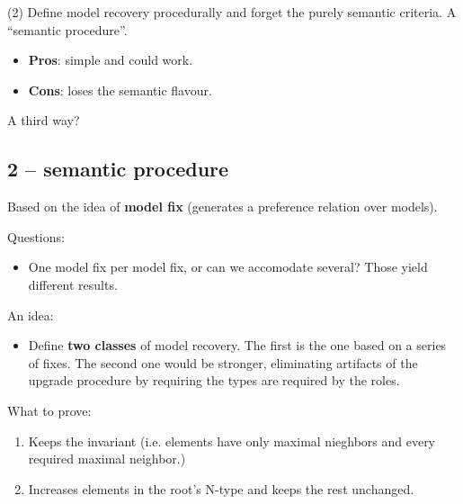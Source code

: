 \documentclass[draft]{article}
\begin{document}
(2) Define model recovery procedurally and forget the purely semantic criteria. A ``semantic procedure''.

\begin{itemize}
  \item \textbf{Pros}: simple and could work.
  \item \textbf{Cons}: loses the semantic flavour.
\end{itemize}

A third way?

\subsection{2 -- semantic procedure}

Based on the idea of \textbf{model fix} (generates a preference relation over models).

Questions:

\begin{itemize}
  \item One model fix per model fix, or can we accomodate several? Those yield different results.
\end{itemize}

An idea:

\begin{itemize}
  \item Define \textbf{two classes} of model recovery. The first is the one based on a series of fixes. The second one would be stronger, eliminating artifacts of the upgrade procedure by requiring the types are required by the roles.
\end{itemize}

What to prove:

\begin{enumerate}
  \item Keeps the invariant (i.e. elements have only maximal nieghbors and every required maximal neighbor.)
  \item Increases elements in the root's N-type and keeps the rest unchanged.
\end{enumerate}



\end{document}
